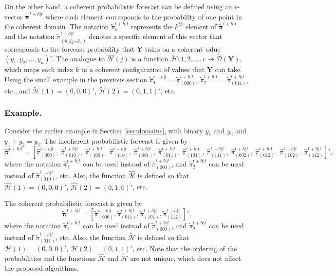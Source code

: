 \documentclass[a4paper,review,12pt,authoryear]{elsarticle}
\newcommand{\bY}{\mathbf{Y}}
\newcommand{\bpi}{\bm{\pi}}
\theoremstyle{definition}
\begin{document}
  On the other hand, a coherent probabilistic forecast can be defined using an $r$-vector $\tilde{\bpi}^{t+h|t}$ where each element corresponds to the probability of one point in the coherent domain.
  The notation $\tilde{\pi}_k^{t+h|t}$ represents the $k^{th}$ element of $\tilde{\bpi}^{t+h|t}$ and the notation $\tilde{\pi}_{(y_1 y_2 \dots y_n)}^{t+h|t}$ denotes a specific element of this vector that corresponds to the forecast probability that $\bY$ takes on a coherent value $(y_1,y_2,\dots,y_n)'$.
  The analogue to $\hat{\mathcal{H}}(j)$ is a function  $\tilde{\mathcal{H}}:{1,2,\dots,r}\rightarrow\tilde{\mathcal{D}}(\bY)$, which maps each index $k$ to a coherent configuration of values that $\bY$ can take.
  Using the small example in the previous section $\tilde{\pi}_1^{t+h|t}=\tilde{\pi}_{(000)}^{t+h|t}$, $\tilde{\pi}_2^{t+h|t}=\tilde{\pi}_{(011)}^{t+h|t}$, etc., and $\tilde{\mathcal{H}}(1)=(0,0,0)'$, $\tilde{\mathcal{H}}(2)=(0,1,1)'$, etc.

  \subsubsection*{\textbf{Example}.}

  Consider the earlier example in Section~\ref{sec:domains}, with binary $y_1$ and $y_2$ and $y_1+y_2=y_3$. The incoherent probabilistic forecast is given by
  \[
    \hat{\bpi}^{t+h|t}= \left[
      \hat{\pi}^{t+h|t}_{(000)}, ~
       \hat{\pi}^{t+h|t}_{(010)},~
       \hat{\pi}^{t+h|t}_{(100)},~
       \hat{\pi}^{t+h|t}_{(110)},~
       \hat{\pi}^{t+h|t}_{(001)},~
       \hat{\pi}^{t+h|t}_{(011)},~
       \hat{\pi}^{t+h|t}_{(101)},~
       \hat{\pi}^{t+h|t}_{(111)},~
       \hat{\pi}^{t+h|t}_{(002)},~
       \hat{\pi}^{t+h|t}_{(012)},~
       \hat{\pi}^{t+h|t}_{(102)},~
       \hat{\pi}^{t+h|t}_{(112)}
       \right]',
  \]
  where the notation $\hat{\pi}^{t+h|t}_{1}$ can be used instead of $\hat{\pi}^{t+h|t}_{(000)}$, and $\hat{\pi}^{t+h|t}_{2}$ can be used instead of $\hat{\pi}^{t+h|t}_{(010)}$, etc. Also, the function $\hat{\mathcal{H}}$ is defined so that $\hat{\mathcal{H}}(1)=(0,0,0)'$, $\hat{\mathcal{H}}(2)=(0,1,0)'$, etc.

  The coherent probabilistic forecast is given by
  \[
  \tilde{\bpi}^{t+h|t}=\left[
  \tilde{\pi}^{t+h|t}_{(000)},
  \tilde{\pi}^{t+h|t}_{(011)},
  \tilde{\pi}^{t+h|t}_{(101)},
  \tilde{\pi}^{t+h|t}_{(112)}
  \right]',\]
  where the notation $\tilde{\pi}^{t+h|t}_{1}$ can be used instead of $\tilde{\pi}^{t+h|t}_{(000)}$, and $\tilde{\pi}^{t+h|t}_{2}$ can be used instead of $\tilde{\pi}^{t+h|t}_{(011)}$, etc. Also, the function $\tilde{\mathcal{H}}$ is defined so that $\tilde{\mathcal{H}}(1)=(0,0,0)'$, $\tilde{\mathcal{H}}(2)=(0,1,1)'$, etc. Note that the ordering of the probabilities and the functions $\hat{\mathcal{H}}$ and $\tilde{\mathcal{H}}$ are not unique, which does not affect the proposed algorithms.
\end{document}
